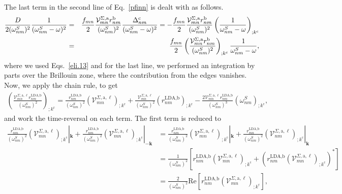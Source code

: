 The last term in the second line of Eq.~\eqref{pfinn} is dealt with as
follows.
\begin{eqnarray}\label{dresn}
\frac{D}{2(\omega^S_{nm})^2}\frac{1}{(\omega^S_{nm}-\omega)^2}
&=&
\frac{f_{mn}}{2}\frac{{\mathbf{\cal V}}^{\Sigma,\mathrm{a}}_{mn}r^{\mathrm{b}}_{nm}}{(\omega^S_{nm})^2}
\frac{\Delta^{\mathrm{c}}_{nm}}{(\omega^S_{nm}-\omega)^2} 
=
-
\frac{f_{mn}}{2}
\frac{{\mathbf{\cal V}}^{\Sigma,\mathrm{a}}_{mn}r^{\mathrm{b}}_{nm}}{(\omega^S_{nm})^2}
\left(
\frac{1}{\omega^S_{nm}-\omega}
\right)_{;k^{\mathrm{c}}}
\nonumber\\
&=&
\frac{f_{mn}}{2}
\left(
\frac{{\mathbf{\cal V}}^{\Sigma,\mathrm{a}}_{mn}r^{\mathrm{b}}_{nm}}{(\omega^S_{nm})^2}
\right)_{;k^{\mathrm{c}}}
\frac{1}{\omega^S_{nm}-\omega}
,
\end{eqnarray} 
where we used Eqs.~\eqref{eli.13}  and for the last
line, we performed an
integration by parts over the Brillouin zone,
where the contribution from the edges vanishes.\cite{ashcroft_solid_1976}
Now, we apply the chain rule, to get
\begin{eqnarray}\label{chr}
\left(\frac{\mathcal{V}^{\Sigma,\text{a},\ell}_{mn}r^{\text{LDA,b}}_{nm}}{(\omega^{S}_{nm})^2}\right)_{;k^{\text{c}}} = \frac{r^{\text{LDA,b}}_{nm}}{(\omega^{S}_{nm})^2}\left(\mathcal{V} ^{\Sigma,\text{a},\ell}_{mn}\right)_{;k^{\text{c}}} + \frac{\mathcal{V}^{\Sigma,\text{a},\ell}_{mn}}{(\omega^{S}_{nm})^2}\left(r^{\text{LDA,b}}_{nm}\right)_{;k^{\text{c}}} - \frac{2\mathcal{V}^{\Sigma,\text{a},\ell}_{mn}r^{\text{LDA,b}}_{nm}}{(\omega^{S}_{nm})^3}\left(
\omega^{S}_{nm}\right)_{;k^{\text{c}}},
\end{eqnarray}
and work the time-reversal on each term.
The first term is reduced to
\begin{align}\label{first_term_gen_deriv}
\frac{r^{\text{LDA,b}}_{nm}}{(\omega^{S}_{nm})^{2}}\left(\mathcal{V}^{\Sigma,\text{a},\ell}_{mn}\right)_{;k^{\text{c}}}|_{\mathbf{k}} + \frac{r^{\text{LDA,b}}_{nm}}{(\omega^{S}_{nm})^{2}}\left(\mathcal{V}^{\Sigma,\text{a},\ell}_{mn}\right)_{;k^{\text{c}}}|_{-\mathbf{k}}
&= \frac{r^{\text{LDA,b}}_{nm}}{(\omega^{S}_{nm})^{2}}\left(\mathcal{V}^{\Sigma,\text{a},\ell}_{mn}\right)_{;k^{\text{c}}}|_{\mathbf{k}} + \frac{r^{\text{LDA,b}}_{mn}}{(\omega^{S}_{nm})^{2}}\left(\mathcal{V}^{\Sigma,\text{a},\ell}_{nm}\right)_{;k^{\text{c}}}|_{\mathbf{k}}\nonumber\\
&= \frac{1}{(\omega^{S}_{nm})^{2}}\left[r^{\text{LDA,b}}_{nm}\left(\mathcal{V}^{\Sigma,\text{a},\ell}_{mn}\right)_{;k^{\text{c}}} + \left(r^{\text{LDA,b}}_{nm}\left(\mathcal{V}^{\Sigma,\text{a},\ell}_{mn}\right)_{;k^{\text{c}}}\right)^*\right]\nonumber\\
&= \frac{2}{(\omega^{S}_{nm})^{2}}\mathrm{Re}\left[r^{\text{LDA,b}}_{nm}\left(\mathcal{V}^{\Sigma,\text{a},\ell}_{mn}\right)_{;k^{\text{c}}}\right],
\end{align}

